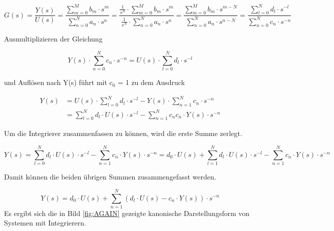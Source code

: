 \begin{equation}\label{eq:sixsixtythree}
G\left(s\right)=\frac{Y\left(s\right)}{U\left(s\right)} =\frac{\sum _{m=0}^{M}b_{m} \cdot s^{m}  }{\sum _{n=0}^{N}a_{n} \cdot s^{n}  } =\frac{\frac{1}{s^{N} } \cdot \sum _{m=0}^{M}b_{m} \cdot s^{m}  }{\frac{1}{s^{N} } \cdot \sum _{n=0}^{N}a_{n} \cdot s^{n}  } =\frac{\sum _{m=0}^{M}b_{m} \cdot s^{m-N}  }{\sum _{n=0}^{N}a_{n} \cdot s^{n-N}  } =\frac{\sum _{l=0}^{N}d_{l} \cdot s^{-l}  }{\sum _{n=0}^{N}c_{n} \cdot s^{-n}  }
\end{equation}

\noindent Ausmultiplizieren der Gleichung 

\begin{equation}\label{eq:sixsixtyfour}
Y\left(s\right)\cdot \sum _{n=0}^{N}c_{n} \cdot s^{-n}  =U\left(s\right)\cdot \sum _{l=0}^{N}d_{l} \cdot s^{-l}
\end{equation}

\noindent und Aufl\"{o}sen nach Y(s) f\"{u}hrt mit c${}_{0}$ = 1 zu dem Ausdruck

\begin{equation}\label{eq:sixsixtyfive}
\begin{split}
Y\left(s\right) &=U\left(s\right)\cdot \sum _{l=0}^{N}d_{l} \cdot s^{-l}  -Y\left(s\right)\cdot \sum _{n=1}^{N}c_{n} \cdot s^{-n}\\
&=\sum _{l=0}^{N}d_{l}\cdot U(s)\cdot s^{-l}-\sum _{n=1}^{N}c_{n}c_{n}\cdot Y(s) \cdot s^{-n}
\end{split}
\end{equation}

\noindent Um die Integrierer zusammenfassen zu k\"{o}nnen, wird die erste Summe zerlegt.

\begin{equation}\label{eq:sixsixtysix}
Y\left(s\right)=\sum _{l=0}^{N}d_{l} \cdot U\left(s\right)\cdot s^{-l}  -\sum _{n=1}^{N}c_{n} \cdot Y\left(s\right)\cdot s^{-n}  =d_{0} \cdot U\left(s\right)+\sum _{l=1}^{N}d_{l} \cdot U\left(s\right)\cdot s^{-l}  -\sum _{n=1}^{N}c_{n} \cdot Y\left(s\right)\cdot s^{-n}
\end{equation}

\noindent Damit k\"{o}nnen die beiden \"{u}brigen Summen zusammengefasst werden.

\begin{equation}\label{eq:sixsixtyseven}
Y\left(s\right)=d_{0} \cdot U\left(s\right)+\sum _{n=1}^{N}\left(d_{l} \cdot U\left(s\right)-c_{n} \cdot Y\left(s\right)\right)\cdot s^{-n}
\end{equation}
\clearpage
\noindent Es ergibt sich die in Bild \ref{fig:AGAIN} gezeigte kanonische Darstellungsform von Systemen mit Integrierern.

